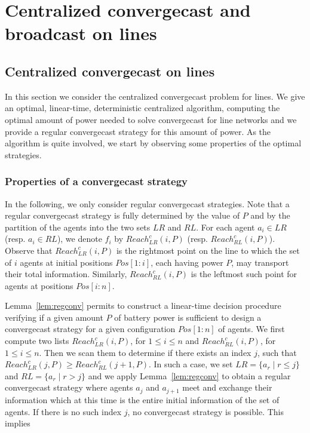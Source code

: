 \documentclass{article}
\newcommand\rclr{Reach_{LR}^c\xspace}
\newcommand\rcrl{Reach_{RL}^c\xspace}
\newcommand\convergecast{convergecast\xspace}
\newcommand\Cccast{Centralized convergecast\xspace}
\begin{document}
\section{{\Cccast} and broadcast on lines}\label{s:line}

\subsection{{\Cccast} on lines}\label{s:line}

In this section we consider the centralized {\convergecast} problem
for lines. We give an optimal, linear-time, deterministic centralized
algorithm, computing the optimal amount of power needed to solve
{\convergecast} for line networks and we provide a regular convergecast strategy for this amount of power. As the algorithm is quite involved,
we start by observing some properties of the optimal
strategies. 




\subsubsection{Properties of a {\convergecast} strategy}\label{sec-properties}

In the following, we only consider regular convergecast strategies. Note that a
regular convergecast strategy is fully determined by the value of $P$ and by the
partition of the agents into the two sets $LR$ and $RL$. For each
agent $a_i \in LR$ (resp.  $a_i \in RL$), we denote $f_i$ by
$\rclr(i,P)$ (resp. $\rcrl(i,P)$). Observe that
$\rclr(i,P)$ is the rightmost point on the line to which the set
of $i$ agents at initial positions $Pos[1:i]$, each having power $P$,
may transport their total information. Similarly,
$\rcrl(i,P)$ is the leftmost such point for agents at positions
$Pos[i:n]$.
 
Lemma~\ref{lem:regconv} permits to construct a linear-time decision
procedure verifying if a given amount $P$ of battery power is
sufficient to design a convergecast strategy for a given configuration
$Pos[1:n]$ of agents.  We first compute two lists $\rclr(i,P)$,
for $1 \leq i \leq n$ and $\rcrl(i,P)$, for $1 \leq i \leq
n$. Then we scan them to determine if there exists an index $j$, such
that $\rclr(j,P) \geq \rcrl(j+1,P)$. In such a case, we set
$LR = \{a_r \mid r \leq j\}$ and $RL = \{a_r\mid r> j\}$ and we apply
Lemma~\ref{lem:regconv} to obtain a regular \convergecast strategy where
agents $a_j$ and $a_{j+1}$ meet and exchange their information which
at this time is the entire initial information of the set of agents. If
there is no such index $j$, no {\convergecast} strategy is
possible. This implies
\end{document}
